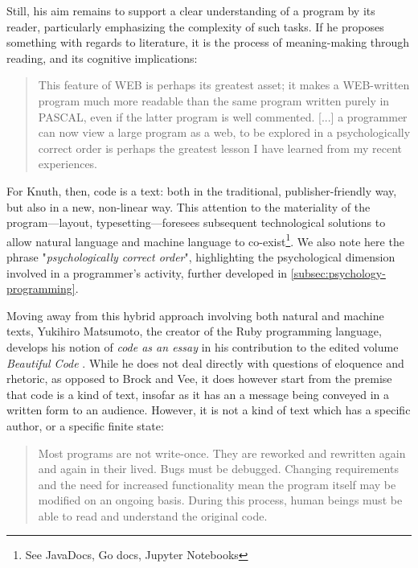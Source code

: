 Still, his aim remains to support a clear understanding of a program by its reader, particularly emphasizing the complexity of such tasks. If he proposes something with regards to literature, it is the process of meaning-making through reading, and its cognitive implications:

\begin{quote}
  This feature of WEB is perhaps its greatest asset; it makes a WEB-written program much more readable than the same program written purely in PASCAL, even if the latter program is well commented.  [...] a programmer can now view a large program as a web, to be explored in a psychologically correct order is perhaps the greatest lesson I have learned from my recent experiences. \citep{knuth_literate_1984}
\end{quote}

For Knuth, then, code is a text: both in the traditional, publisher-friendly way, but also in a new, non-linear way. This attention to the materiality of the program—layout, typesetting—foresees subsequent technological solutions to allow natural language and machine language to co-exist\footnote{See JavaDocs, Go docs, Jupyter Notebooks}. We also note here the phrase "\emph{psychologically correct order}", highlighting the psychological dimension involved in a programmer's activity, further developed in \ref{subsec:psychology-programming}.

Moving away from this hybrid approach involving both natural and machine texts, Yukihiro Matsumoto, the creator of the Ruby programming language, develops his notion of \emph{code as an essay} in his contribution to the edited volume \emph{Beautiful Code} \citep{oram_beautiful_2007}. While he does not deal directly with questions of eloquence and rhetoric, as opposed to Brock and Vee, it does however start from the premise that code is a kind of text, insofar as it has an a message being conveyed in a written form to an audience. However, it is not a kind of text which has a specific author, or a specific finite state:

\begin{quote}
  Most programs are not write-once. They are reworked and rewritten again and again in their lived. Bugs must be debugged. Changing requirements and the need for increased functionality mean the program itself may be modified on an ongoing basis. During this process, human beings must be able to read and understand the original code. \citep{matsumoto_treating_2007}
\end{quote}

